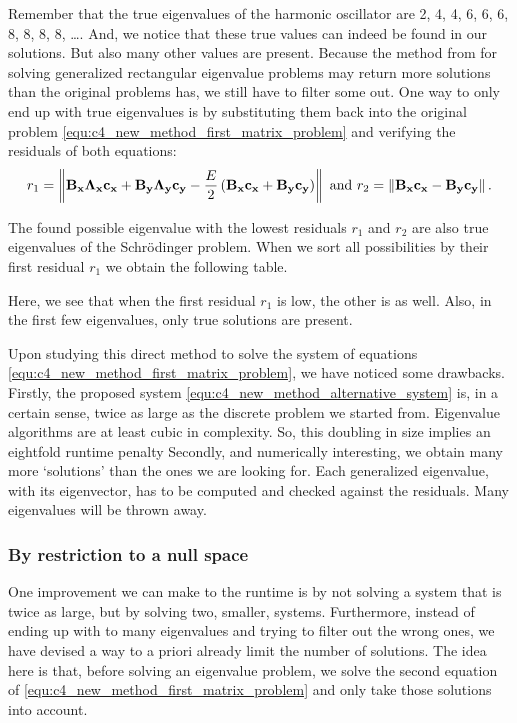 Remember that the true eigenvalues of the harmonic oscillator are 2, 4, 4, 6, 6, 6, 8, 8, 8, 8, \dots. And, we notice that these true values can indeed be found in our solutions. But also many other values are present. Because the method from \cite{hua_svd_1991} for solving generalized rectangular eigenvalue problems may return more solutions than the original problems has, we still have to filter some out. One way to only end up with true eigenvalues is by substituting them back into the original problem \eqref{equ:c4_new_method_first_matrix_problem} and verifying the residuals of both equations:
$$
    r_1 = \left\| \vb{B_x} \vb{\Lambda_x} \vb{c_x} + \vb{B_y} \vb{\Lambda_y} \vb{c_y} - \frac{E}{2}\left(\vb{B_x}\vb{c_x} + \vb{B_y}\vb{c_y}\right) \right\| \text{ and } r_2=\left\| \vb{B_x} \vb{c_x} - \vb{B_y} \vb{c_y} \right\|\text{.}
$$

The found possible eigenvalue with the lowest residuals $r_1$ and $r_2$ are also true eigenvalues of the Schrödinger problem. When we sort all possibilities by their first residual $r_1$ we obtain the following table.

\begin{center}
    
\end{center}

Here, we see that when the first residual $r_1$ is low, the other is as well. Also, in the first few eigenvalues, only true solutions are present.

Upon studying this direct method to solve the system of equations \eqref{equ:c4_new_method_first_matrix_problem}, we have noticed some drawbacks. Firstly, the proposed system \eqref{equ:c4_new_method_alternative_system} is, in a certain sense, twice as large as the discrete problem we started from. Eigenvalue algorithms are at least cubic in complexity. So, this doubling in size implies an eightfold runtime penalty Secondly, and numerically interesting, we obtain many more `solutions' than the ones we are looking for. Each generalized eigenvalue, with its eigenvector, has to be computed and checked against the residuals. Many eigenvalues will be thrown away.

\subsubsection{By restriction to a null space}\label{sec:nm_by_restriction}

One improvement we can make to the runtime is by not solving a system that is twice as large, but by solving two, smaller, systems. Furthermore, instead of ending up with to many eigenvalues and trying to filter out the wrong ones, we have devised a way to a priori already limit the number of solutions. The idea here is that, before solving an eigenvalue problem, we solve the second equation of \eqref{equ:c4_new_method_first_matrix_problem} and only take those solutions into account.


